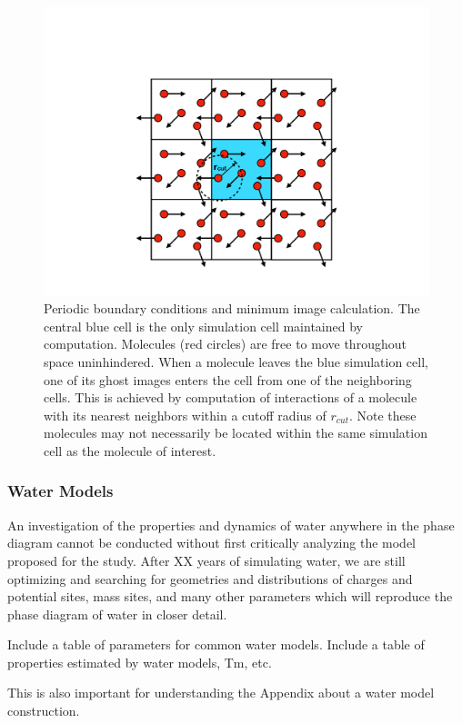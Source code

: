 \begin{figure}
\includegraphics[width=\linewidth]{Figures/PBC}
\caption{\label{fig:PBC} Periodic boundary conditions and minimum
  image calculation. The central blue cell is the only simulation cell
  maintained by computation. Molecules (red circles) are free to move
  throughout space uninhindered. When a molecule leaves the blue
  simulation cell, one of its ghost images enters the cell from one of
  the neighboring cells. This is achieved by computation of
  interactions of a molecule with its nearest neighbors within a
  cutoff radius of $r_{cut}$. Note these molecules may not necessarily
  be located within the same simulation cell as the molecule of
  interest.}
\end{figure}



\subsubsection{Water Models}
An investigation of the properties and dynamics of water anywhere in
the phase diagram cannot be conducted without first critically
analyzing the model proposed for the study. After XX years of
simulating water, we are still optimizing and searching for geometries
and distributions of charges and potential sites, mass sites, and many
other parameters which will reproduce the phase diagram of water in
closer detail. 

Include a table of parameters for common water models.
Include a table of properties estimated by water models, Tm, etc.

This is also important for understanding the Appendix about a water
model construction.

